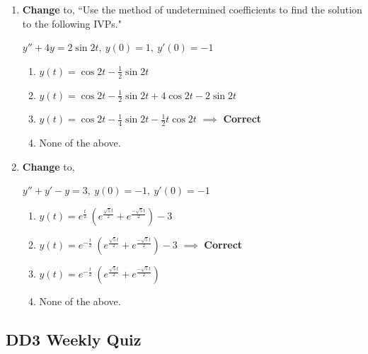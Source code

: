\documentclass[fleqn]{article}[11pt]
\begin{document}
\begin{enumerate}
	\item \textbf{Change} to, ``Use the method of undetermined coefficients to find the solution to the following IVPs."
	
		\(y''+4y=2\sin{2t},\ y(0)=1,\ y'(0)=-1\)
			\begin{enumerate}
				\item $y(t)=\cos{2t}-\frac{1}{2}\sin{2t}$
				\item $y(t)=\cos{2t}-\frac{1}{2}\sin{2t}+4\cos{2t}-2\sin{2t}$
				\item $y(t)=\cos{2t}-\frac{1}{4}\sin{2t}-\frac{1}{2}t\cos{2t}$ $\implies$ \textbf{Correct}
				\item None of the above.
			\end{enumerate}

	\item \textbf{Change} to,
	
		\(y''+y'-y=3,\ y(0)=-1,\ y'(0)=-1\)
			\begin{enumerate}
				\item $y(t)=e^{\frac{t}{2}}\ (e^{\frac{\sqrt{5}t}{2}}+e^{\frac{-\sqrt{5}t}{2}})-3$
				\item $y(t)=e^{-\frac{t}{2}}\ (e^{\frac{\sqrt{5}t}{2}}+e^{\frac{-\sqrt{5}t}{2}})-3$ $\implies$ \textbf{Correct}
				\item $y(t)=e^{-\frac{t}{2}}\ (e^{\frac{\sqrt{5}t}{2}}+e^{\frac{-\sqrt{5}t}{2}})$
				\item None of the above.
			\end{enumerate}

\end{enumerate}

\subsection*{DD3 Weekly Quiz}
\end{document}
